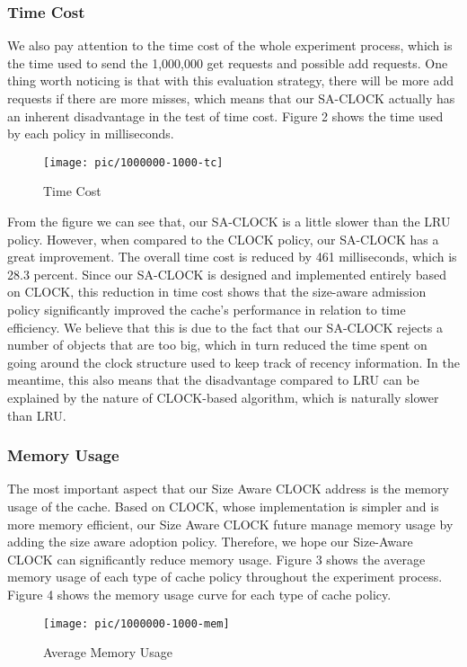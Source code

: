\documentclass[conference]{IEEEtran}
\begin{document}
\subsubsection{Time Cost}
We also pay attention to the time cost of the whole experiment process, which is the time used to send the 1,000,000 get requests and possible add requests. One thing worth noticing is that with this evaluation strategy, there will be more add requests if there are more misses, which means that our SA-CLOCK actually has an inherent disadvantage in the test of time cost. Figure 2 shows the time used by each policy in milliseconds.

\begin{figure}[h]
    \centering
    \texttt{[image: pic/1000000-1000-tc]}
    \caption{Time Cost}
\end{figure}

From the figure we can see that, our SA-CLOCK is a little slower than the LRU policy. However, when compared to the CLOCK policy, our SA-CLOCK has a great improvement. The overall time cost is reduced by 461 milliseconds, which is 28.3 percent. Since our SA-CLOCK is designed and implemented entirely based on CLOCK, this reduction in time cost shows that the size-aware admission policy significantly improved the cache's performance in relation to time efficiency. We believe that this is due to the fact that our SA-CLOCK rejects a number of objects that are too big, which in turn reduced the time spent on going around the clock structure used to keep track of recency information. In the meantime, this also means that the disadvantage compared to LRU can be explained by the nature of CLOCK-based algorithm, which is naturally slower than LRU.


\subsubsection{Memory Usage}
The most important aspect that our Size Aware CLOCK address is the memory usage of the cache. Based on CLOCK, whose implementation is simpler and is more memory efficient, our Size Aware CLOCK future manage memory usage by adding the size aware adoption policy. Therefore, we hope our Size-Aware CLOCK can significantly reduce memory usage. Figure 3 shows the average memory usage of each type of cache policy throughout the experiment process. Figure 4 shows the memory usage curve for each type of cache policy.

\begin{figure}[h]
\centerline{\texttt{[image: pic/1000000-1000-mem]}}
\caption{Average Memory Usage}
\label{fig}
\end{figure}
\end{document}
